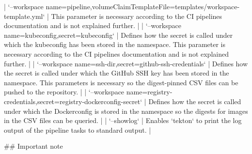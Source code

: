 | `--workspace name=pipeline,volumeClaimTemplateFile=templates/workspace-template.yml` | This parameter is necessary according to the CI pipelines documentation and is not explained further.                                                                                                                                                                                                                                                                                                                      |
| `--workspace name=kubeconfig,secret=kubeconfig`                                      | Defines how the secret is called under which the kubeconfig has been stored in the namespace. This parameter is necessary according to the CI pipelines documentation and is not explained further.                                                                                                                                                                                                                        |
| `--workspace name=ssh-dir,secret=github-ssh-credentials`                             | Defines how the secret is called under which the GitHub SSH key has been stored in the namespace. This parameters is necessary so the digest-pinned CSV files can be pushed to the repository.                                                                                                                                                                                                                             |
| `--workspace name=registry-credentials,secret=registry-dockerconfig-secret`          | Defines how the secret is called under which the Dockerconfig is stored in the namespace so the digests for images in the CSV files can be queried.                                                                                                                                                                                                                                                                        |
| `--showlog`                                                                          | Enables `tekton` to print the log output of the pipeline tasks to standard output.                                                                                                                                                                                                                                                                                                                                         |

## Important note

